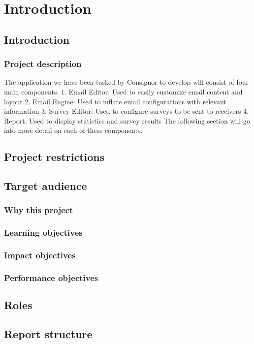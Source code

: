\chapter{Introduction}

\section{Introduction}
\subsection{Project description}
The application we have been tasked by Consignor to develop will consist of four main
components.
1. Email Editor: Used to easily customize email content and layout
2. Email Engine: Used to inflate email configurations with relevant information
3. Survey Editor: Used to configure surveys to be sent to receivers
4. Report: Used to display statistics and survey results
The following section will go into more detail on each of these components.

\section{Project restrictions}

\section{Target audience}

\subsection{Why this project}
\subsection{Learning objectives}
\subsection{Impact objectives}
\subsection{Performance objectives}
\section{Roles}
\section{Report structure}